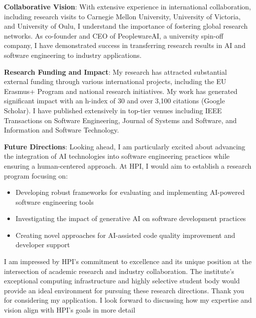 \textbf{Collaborative Vision}:
With extensive experience in international collaboration, including research visits to Carnegie Mellon University, University of Victoria, and University of Oulu, I understand the importance of fostering global research networks. As co-founder and CEO of PeoplewareAI, a university spin-off company, I have demonstrated success in transferring research results in AI and software engineering to industry applications. 

\textbf{Research Funding and Impact}:
My research has attracted substantial external funding through various international projects, including the EU Erasmus+ Program and national research initiatives. My work has generated significant impact with an h-index of 30 and over 3,100 citations (Google Scholar). I have published extensively in top-tier venues including IEEE Transactions on Software Engineering, Journal of Systems and Software, and Information and Software Technology.

\textbf{Future Directions}:
Looking ahead, I am particularly excited about advancing the integration of AI technologies into software engineering practices while ensuring a human-centered approach. At HPI, I would aim to establish a research program focusing on:

\begin{itemize}
\item Developing robust frameworks for evaluating and implementing AI-powered software engineering tools
\item Investigating the impact of generative AI on software development practices
\item Creating novel approaches for AI-assisted code quality improvement and developer support
\end{itemize}

I am impressed by HPI's commitment to excellence and its unique position at the intersection of academic research and industry collaboration. The institute's exceptional computing infrastructure and highly selective student body would provide an ideal environment for pursuing these research directions.
Thank you for considering my application. I look forward to discussing how my expertise and vision align with HPI's goals in more detail